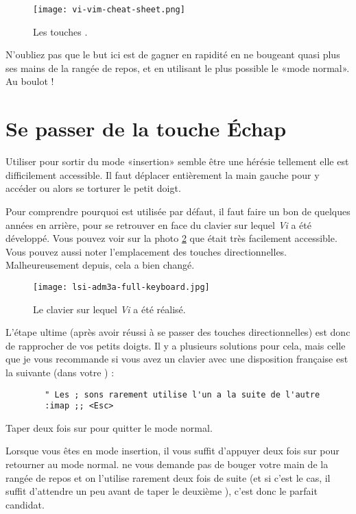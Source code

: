 \begin{figure}%
  \texttt{[image: vi-vim-cheat-sheet.png]}
  \caption{Les touches \vim.}
  \label{fig:vim-cheat-sheet}
\end{figure}

N'oubliez pas que le but ici est de gagner en rapidité en ne bougeant quasi plus ses mains de la rangée de repos, et en utilisant le plus possible le «mode normal». Au boulot !

\section{Se passer de la touche Échap}\label{sec:esc}

Utiliser \ttesc pour sortir du mode «insertion» semble être une hérésie tellement elle est difficilement accessible. Il faut déplacer entièrement la main gauche pour y accéder ou alors se torturer le petit doigt.

Pour comprendre pourquoi \ttesc est utilisée par défaut, il faut faire un bon de quelques années en arrière, pour se retrouver en face du clavier sur lequel \emph{Vi} a été développé. Vous pouvez voir sur la photo \ref{fig:vim-keyboard} que \ttesc était très facilement accessible. Vous pouvez aussi noter l'emplacement des touches directionnelles. Malheureusement depuis, cela a bien changé.

\begin{figure}%
  \texttt{[image: lsi-adm3a-full-keyboard.jpg]}
  \caption{Le clavier sur lequel \emph{Vi} a été réalisé.}
  \label{fig:vim-keyboard}
\end{figure}

L'étape ultime (après avoir réussi à se passer des touches directionnelles) est donc de rapprocher \ttesc de vos petits doigts. Il y a plusieurs solutions pour cela, mais celle que je vous recommande si vous avez un clavier avec une disposition française est la suivante (dans votre \vimrc) :

\begin{listing}[H]

    \begin{verbatim}
        " Les ; sons rarement utilise l'un a la suite de l'autre
        :imap ;; <Esc>
    \end{verbatim}
    \caption{Taper deux fois sur \hlred{;} pour quitter le mode normal.}
    \label{code:avoid-esc}
\end{listing}

Lorsque vous êtes en mode insertion, il vous suffit d'appuyer deux fois sur \ttsemicolon pour retourner au mode normal. \ttsemicolon ne vous demande pas de bouger votre main de la rangée de repos et on l'utilise rarement deux fois de suite (et si c'est le cas, il suffit d'attendre un peu avant de taper le deuxième \tsemicolon), c'est donc le parfait candidat.

